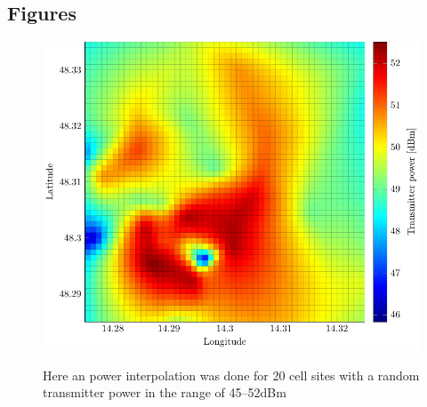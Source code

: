 \documentclass[twocolumn]{bmcart}%
\begin{document}
\begin{backmatter}
	
	
	
	
	\section*{Figures}
	 
	
	\begin{figure}[h!]

		\caption{
		Here an power interpolation was done for 20 cell sites with a random transmitter power in the range of 45--52dBm}
		\includegraphics[width=0.9\columnwidth]{senderpower}
				\label{fig:transmitpower}
	\end{figure}
	\begin{figure}[h!]
		

\end{figure}
\end{backmatter}
\end{document}
